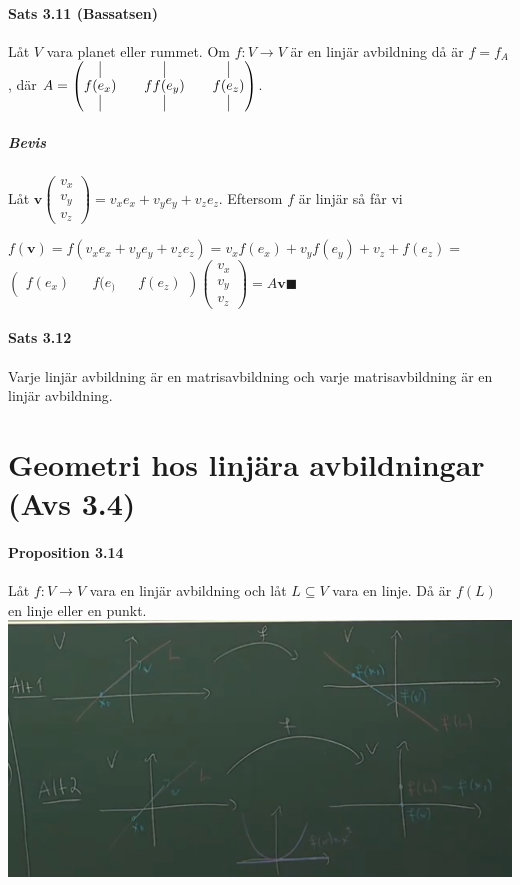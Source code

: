 \paragraph{Sats 3.11 (Bassatsen)} Låt $V$ vara planet eller rummet.
Om $f:V\rightarrow V$ är en linjär avbildning då är $f=f_{A}$, där
$A=\begin{pmatrix}
        \vline   &  & \vline    &  & \vline   \\
        f(e_{x}) &  & ff(e_{y}) &  & f(e_{z}) \\
        \vline   &  & \vline    &  & \vline
    \end{pmatrix}$.
\subparagraph{Bevis} Låt $\bm{v}\begin{pmatrix}
        v_{x} \\v_{y}\\v_{z}
    \end{pmatrix} =
    v_{x}e_{x}+v_{y}e_{y}+v_{z}e_{z}$.
Eftersom $f$ är linjär så får vi \\
\begin{center}
    $f(\bm{v})=f(v_{x}e_{x}+v_{y}e_{y}+v_{z}e_{z})=v_{x}f(e_{x})+v_{y}f(e_{y})+v_{z}+f(e_{z})=$ \\
    $\begin{pmatrix}
        f(e_{x}) &  & f(e_) &  & f(e_{z})
    \end{pmatrix}
    \begin{pmatrix}
        v_{x} \\v_{y}\\v_{z}
    \end{pmatrix}=A\bm{v} \blacksquare$
\end{center}


\paragraph{Sats 3.12} Varje linjär avbildning är en matrisavbildning och varje matrisavbildning är en linjär avbildning.

\section{Geometri hos linjära avbildningar (Avs 3.4)}
\paragraph{Proposition 3.14} Låt $f:V \rightarrow V$ vara en linjär avbildning och låt $L\subseteq V$ vara en linje.
Då är $f(L)$ en linje eller en punkt.\\
\includegraphics[scale=0.36]{imgs/img01.png}


